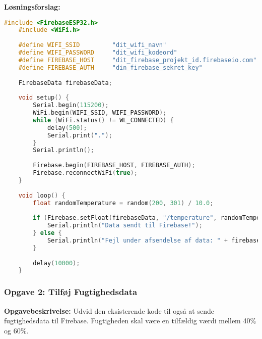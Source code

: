 \textbf{Løsningsforslag:}
\begin{lstlisting}[language=C++]
	#include <FirebaseESP32.h>
	#include <WiFi.h>
	
	#define WIFI_SSID         "dit_wifi_navn"
	#define WIFI_PASSWORD     "dit_wifi_kodeord"
	#define FIREBASE_HOST     "dit_firebase_projekt_id.firebaseio.com"
	#define FIREBASE_AUTH     "din_firebase_sekret_key"
	
	FirebaseData firebaseData;
	
	void setup() {
		Serial.begin(115200);
		WiFi.begin(WIFI_SSID, WIFI_PASSWORD);
		while (WiFi.status() != WL_CONNECTED) {
			delay(500);
			Serial.print(".");
		}
		Serial.println();
		
		Firebase.begin(FIREBASE_HOST, FIREBASE_AUTH);
		Firebase.reconnectWiFi(true);
	}
	
	void loop() {
		float randomTemperature = random(200, 301) / 10.0;
		
		if (Firebase.setFloat(firebaseData, "/temperature", randomTemperature)) {
			Serial.println("Data sendt til Firebase!");
		} else {
			Serial.println("Fejl under afsendelse af data: " + firebaseData.errorReason());
		}
		
		delay(10000);
	}
\end{lstlisting}           

\subsubsection*{Opgave 2: Tilføj Fugtighedsdata}

\textbf{Opgavebeskrivelse:} Udvid den eksisterende kode til også at sende fugtighedsdata til Firebase. Fugtigheden skal være en tilfældig værdi mellem 40\% og 60\%.

